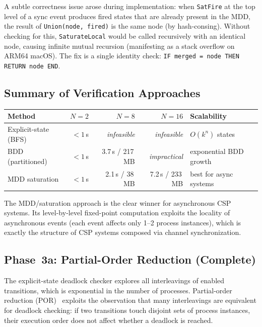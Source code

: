 \documentclass[11pt]{article}
\begin{document}
A subtle correctness issue arose during implementation: when
\texttt{SatFire} at the top level of a sync event produces fired
states that are already present in the MDD, the result of
\texttt{Union(node, fired)} is the same node (by hash-consing).
Without checking for this, \texttt{SaturateLocal} would be called
recursively with an identical node, causing infinite mutual recursion
(manifesting as a stack overflow on ARM64 macOS).  The fix is a
single identity check: \texttt{IF merged = node THEN RETURN node END}.

\subsection{Summary of Verification Approaches}

\begin{center}
\begin{tabular}{lrrrl}
\toprule
\textbf{Method} & \textbf{$N{=}2$} & \textbf{$N{=}8$} & \textbf{$N{=}16$} & \textbf{Scalability} \\
\midrule
Explicit-state (BFS) & $< 1$\,s & \textit{infeasible} & \textit{infeasible} & $O(k^n)$ states \\
BDD (partitioned) & $< 1$\,s & 3.7\,s / 217\,MB & \textit{impractical} & exponential BDD growth \\
MDD saturation & $< 1$\,s & 2.1\,s / 38\,MB & 7.2\,s / 233\,MB & best for async systems \\
\bottomrule
\end{tabular}
\end{center}

The MDD/saturation approach is the clear winner for asynchronous CSP
systems.  Its level-by-level fixed-point computation exploits the
locality of asynchronous events (each event affects only 1--2 process
instances), which is exactly the structure of CSP systems composed via
channel synchronization.

\subsection{Phase~3a: Partial-Order Reduction (Complete)}

The explicit-state deadlock checker explores all interleavings of
enabled transitions, which is exponential in the number of processes.
Partial-order reduction (POR)~\cite{por} exploits the observation that
many interleavings are equivalent for deadlock checking: if two
transitions touch disjoint sets of process instances, their execution
order does not affect whether a deadlock is reached.
\end{document}
